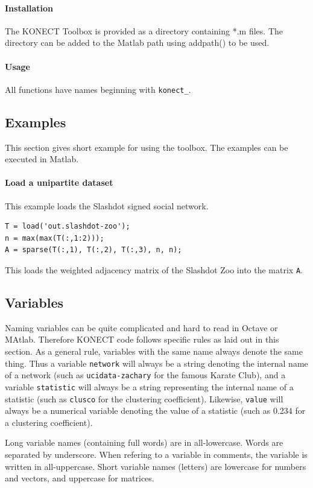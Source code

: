 \documentclass{article}
\begin{document}
\paragraph{Installation}
The KONECT Toolbox is provided as a directory containing *.m files.  The
directory can be added to the Matlab path using addpath() to be used.

\paragraph{Usage}
All functions have names beginning with \texttt{konect\_}.

\subsection{Examples}
This section gives short example for using the toolbox.  The examples
can be executed in Matlab. 

\paragraph{Load a unipartite dataset}
This example loads the Slashdot signed social network. 

\begin{verbatim}
T = load('out.slashdot-zoo');
n = max(max(T(:,1:2)));
A = sparse(T(:,1), T(:,2), T(:,3), n, n); 
\end{verbatim}

This loads the weighted adjacency matrix of the Slashdot Zoo into the
matrix \texttt{A}. 

\subsection{Variables}
Naming variables can be quite complicated and hard to read in
Octave or MAtlab. Therefore KONECT code follows specific rules as laid
out in this section.  As a general rule, variables with the same name
always denote the same thing.  Thus a variable \texttt{network} will
always be a string denoting the internal name of a network (such as
\texttt{ucidata-zachary} for the famous Karate Club), and a
variable \texttt{statistic} will always be a string representing the
internal name of a statistic (such as \texttt{clusco} for the clustering
coefficient).   Likewise, \texttt{value} will always be a numerical
variable denoting the value of a statistic (such as 0.234 for a
clustering coefficient). 

Long variable names (containing full words) are in all-lowercase. Words
are separated by underscore.  When refering to a variable in comments,
the variable is written in all-uppercase.  Short variable names
(letters) are lowercase for numbers and vectors, and uppercase for
matrices.
\end{document}
